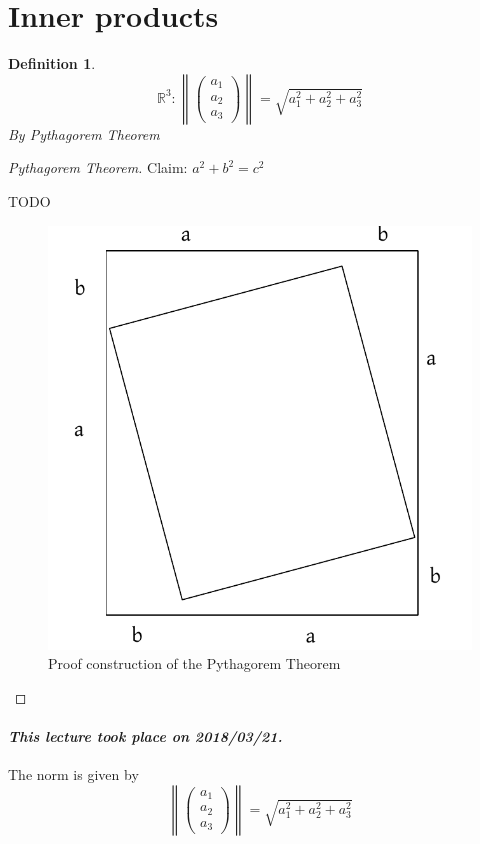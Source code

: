 \documentclass{article}
\newtheorem{definition}{Definition}  \numberwithin{definition}{section}
\newcommand{\norm}[1]{\left\|#1\right\|}
\newcommand{\dateref}[1]{\paragraph{\textit{This lecture took place on #1.}}}
\begin{document}
\section{Inner products}

\begin{definition} %
  \[ \mathbb R^3: \norm{\begin{pmatrix} a_1 \\ a_2 \\ a_3 \end{pmatrix}} = \sqrt{a_1^2 + a_2^2 + a_3^2} \]
  By Pythagorem Theorem
\end{definition}

\begin{proof}[Pythagorem Theorem]
  Claim: $a^2 + b^2 = c^2$

  TODO

  \begin{figure}[!h]
    \begin{center}
      \includegraphics{img/03_pytha.pdf}
      \caption{Proof construction of the Pythagorem Theorem}
      \label{fig:pytha}
    \end{center}
  \end{figure}
\end{proof}

\dateref{2018/03/21}

The norm is given by
\[ \norm{\begin{pmatrix} a_1 \\ a_2 \\ a_3 \end{pmatrix}} = \sqrt{a_1^2 + a_2^2 + a_3^2} \]
\end{document}
